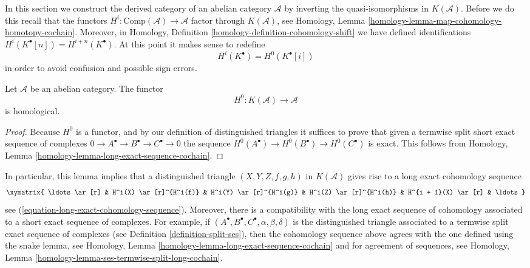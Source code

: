 \noindent
In this section we construct the derived category of an abelian category
$\mathcal{A}$ by inverting the quasi-isomorphisms in $K(\mathcal{A})$.
Before we do this recall that the functors
$H^i : \text{Comp}(\mathcal{A}) \to \mathcal{A}$
factor through $K(\mathcal{A})$, see
Homology, Lemma \ref{homology-lemma-map-cohomology-homotopy-cochain}.
Moreover, in
Homology, Definition \ref{homology-definition-cohomology-shift}
we have defined identifications $H^i(K^\bullet[n]) = H^{i + n}(K^\bullet)$.
At this point it makes sense to redefine
$$
H^i(K^\bullet) = H^0(K^\bullet[i])
$$
in order to avoid confusion and possible sign errors.

\begin{lemma}
\label{lemma-cohomology-homological}
Let $\mathcal{A}$ be an abelian category. The functor
$$
H^0 : K(\mathcal{A}) \longrightarrow \mathcal{A}
$$
is homological.
\end{lemma}

\begin{proof}
Because $H^0$ is a functor, and by our definition of distinguished triangles
it suffices to prove that given a termwise split short exact sequence
of complexes $0 \to A^\bullet \to B^\bullet \to C^\bullet \to 0$
the sequence $H^0(A^\bullet) \to H^0(B^\bullet) \to H^0(C^\bullet)$
is exact. This follows from
Homology, Lemma \ref{homology-lemma-long-exact-sequence-cochain}.
\end{proof}

\noindent
In particular, this lemma implies that a distinguished triangle
$(X, Y, Z, f, g, h)$ in $K(\mathcal{A})$ gives rise to a long exact
cohomology sequence
\begin{equation}
\label{equation-long-exact-cohomology-sequence-D}
\xymatrix{
\ldots \ar[r] &
H^i(X) \ar[r]^{H^i(f)} &
H^i(Y) \ar[r]^{H^i(g)} &
H^i(Z) \ar[r]^{H^i(h)} &
H^{i + 1}(X) \ar[r] & \ldots
}
\end{equation}
see (\ref{equation-long-exact-cohomology-sequence}). Moreover, there is
a compatibility with the long exact sequence of cohomology associated to
a short exact sequence of complexes. For
example, if $(A^\bullet, B^\bullet, C^\bullet, \alpha, \beta, \delta)$
is the distinguished triangle associated to a termwise split exact
sequence of complexes (see
Definition \ref{definition-split-ses}),
then the cohomology sequence above agrees with the one defined using the
snake lemma, see
Homology, Lemma \ref{homology-lemma-long-exact-sequence-cochain}
and for agreement of sequences, see
Homology, Lemma \ref{homology-lemma-ses-termwise-split-long-cochain}.

